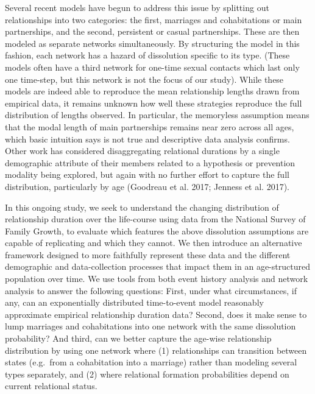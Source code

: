 \documentclass [11pt, proquest] {uwthesis}[2015/03/03]
\begin{document}
Several recent models have begun to address this issue by splitting out
relationships into two categories: the first, marriages and
cohabitations or main partnerships, and the second, persistent or casual
partnerships. These are then modeled as separate networks
simultaneously. By structuring the model in this fashion, each network
has a hazard of dissolution specific to its type. (These models often
have a third network for one-time sexual contacts which last only one
time-step, but this network is not the focus of our study). While these
models are indeed able to reproduce the mean relationship lengths drawn
from empirical data, it remains unknown how well these strategies
reproduce the full distribution of lengths observed. In particular, the
memoryless assumption means that the modal length of main partnerships
remains near zero across all ages, which basic intuition says is not
true and descriptive data analysis confirms. Other work has considered
disaggregating relational durations by a single demographic attribute of
their members related to a hypothesis or prevention modality being
explored, but again with no further effort to capture the full
distribution, particularly by age (Goodreau et al. 2017; Jenness et al.
2017).

In this ongoing study, we seek to understand the changing distribution
of relationship duration over the life-course using data from the
National Survey of Family Growth, to evaluate which features the above
dissolution assumptions are capable of replicating and which they
cannot. We then introduce an alternative framework designed to more
faithfully represent these data and the different demographic and
data-collection processes that impact them in an age-structured
population over time. We use tools from both event history analysis and
network analysis to answer the following questions: First, under what
circumstances, if any, can an exponentially distributed time-to-event
model reasonably approximate empirical relationship duration data?
Second, does it make sense to lump marriages and cohabitations into one
network with the same dissolution probability? And third, can we better
capture the age-wise relationship distribution by using one network
where (1) relationships can transition between states (e.g.~from a
cohabitation into a marriage) rather than modeling several types
separately, and (2) where relational formation probabilities depend on
current relational status.
\end{document}
